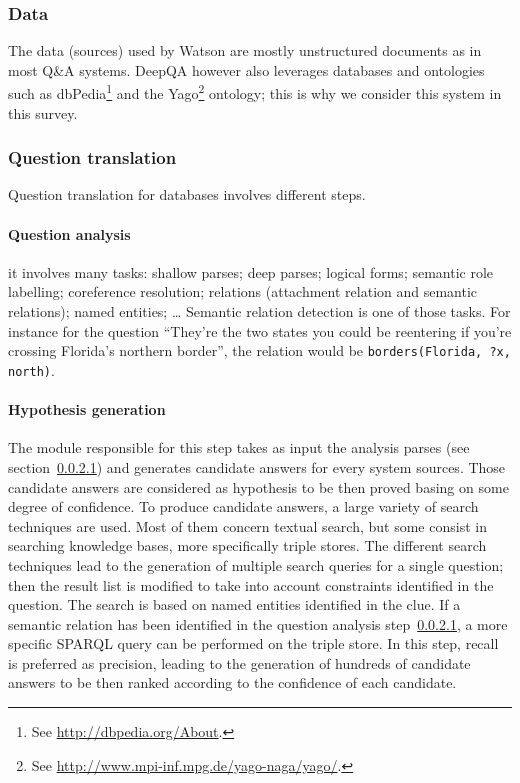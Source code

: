 \documentclass[10pt,journal,letterpaper,compsoc]{IEEEtran}
\begin{document}
\subsubsection{Data}
The data (sources) used by {\sc Watson} are mostly unstructured documents as in
most Q\&A systems. {\sc DeepQA} however also leverages databases and ontologies
such as {\sc dbPedia}\footnote{See \url{http://dbpedia.org/About}.} and the {\sc
Yago}\footnote{See \url{http://www.mpi-inf.mpg.de/yago-naga/yago/}.} ontology;
this is why we consider this system in this survey.



\subsubsection{Question translation}
Question translation for databases involves different steps.
\paragraph{Question analysis}
\label{sec:jeoparty-question-analysis}
it involves many tasks: shallow parses;
deep parses; logical forms; semantic role labelling; coreference resolution;
relations (attachment relation and semantic relations); named entities; \ldots
Semantic relation detection is one of those tasks. 
For instance for the question ``They're the two states you could be reentering
if you're crossing Florida's northern border'', the relation would be
\verb+borders(Florida, ?x, north)+.

\paragraph{Hypothesis generation}
The module responsible for this step takes as input the analysis parses
(see section~\ref{sec:jeoparty-question-analysis}) and generates candidate
answers for every system sources. Those candidate answers are considered as
hypothesis to be then proved basing on some degree of confidence. 
To produce candidate answers, a large variety of search techniques are used.
Most of them concern textual search, but some consist in searching knowledge
bases, more specifically triple stores. 
The different search techniques lead to the generation of multiple search
queries for a single question; then the result list is modified to take into
account constraints identified in the question. 
The search is based on named entities identified in the clue. If a semantic
relation has been identified in the question analysis
step~\ref{sec:jeoparty-question-analysis}, a more specific SPARQL query can be
performed on the triple store. 
In this step, recall is preferred as precision, leading to the generation of
hundreds of candidate answers to be then ranked according to the confidence of
each candidate.
\end{document}
